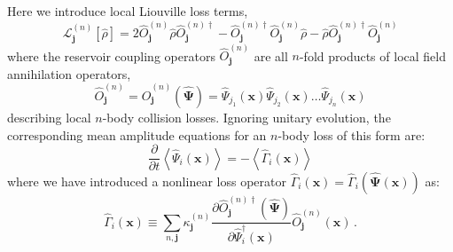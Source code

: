 \documentclass[aps,prl,twocolumn,showpacs,amsmath,amssymb,superscriptaddress]{revtex4-1}
\newcommand{\xvec}{\boldsymbol{x}}
\newcommand{\jvec}{\boldsymbol{j}}
\newcommand{\Psivec}{\boldsymbol{\Psi}}
\begin{document}
Here we introduce local Liouville loss terms,
\begin{equation}
	\mathcal{L}_{\jvec}^{(n)} \left[ \hat{\rho}\right] =
	2 \hat{O}_{\jvec}^{(n)} \hat{\rho}\hat{O}_{\jvec}^{(n)\dagger} -
	\hat{O}_{\jvec}^{(n)\dagger}\hat{O}_{\jvec}^{(n)}\hat{\rho} -
	\hat{\rho}\hat{O}_{\jvec}^{(n)\dagger}\hat{O}_{\jvec}^{(n)}
\end{equation}
where the reservoir coupling operators $\hat{O}_{\jvec}^{(n)}$
are all $n$-fold products of local field annihilation operators,
\begin{equation}
	\hat{O}_{\jvec}^{(n)} =
	\hat{O}_{\jvec}^{(n)} \left( \widehat{\Psivec} \right) =
	\widehat{\Psi}_{j_{1}} \left( \xvec \right)
	\widehat{\Psi}_{j_{2}} \left( \xvec \right) \ldots
	\widehat{\Psi}_{j_{n}} \left( \xvec \right)
\end{equation}
describing local $n$-body collision losses.
Ignoring unitary evolution, the corresponding mean amplitude equations
for an $n$-body loss of this form are:
\begin{equation}
	\frac{\partial}{\partial t} \left\langle
		\widehat{\Psi}_{i} \left( \xvec \right)
	\right\rangle =
	-\left\langle \hat{\Gamma}_{i} \left( \xvec \right) \right\rangle
\end{equation}
where we have introduced a nonlinear loss operator $\hat{\Gamma}_{i} \left( \xvec \right) =
\hat{\Gamma}_{i} \left( \widehat{\Psivec} \left( \xvec \right) \right)$ as:
\begin{equation}
	\hat{\Gamma}_{i} \left( \xvec \right) \equiv
	\sum_{n,\jvec} \kappa_{\jvec}^{(n)}
	\frac{\partial\hat{O}_{\jvec}^{(n)\dagger}	\left( \widehat{\Psivec} \right)}
		{\partial \hat{\Psi}_{i}^{\dagger} \left( \xvec \right)}
	\hat{O}_{\jvec}^{(n)} \left( \xvec \right) \,.
\end{equation}
\end{document}
